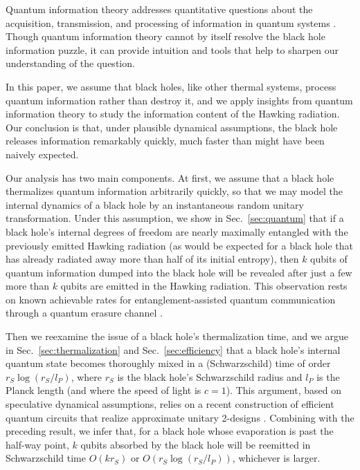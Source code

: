 \documentclass[11pt]{article}
\begin{document}
Quantum information theory addresses quantitative questions about the acquisition, transmission, and processing of information in quantum systems \cite{bennett-shor}. Though quantum information theory cannot by itself resolve the black hole information puzzle, it can provide intuition and tools that help to sharpen our understanding of the question. 

In this paper, we assume that black holes, like other thermal systems, process quantum information rather than destroy it, and we apply insights from quantum information theory to study the information content of the Hawking radiation. Our conclusion is that, under plausible dynamical assumptions, the black hole releases information remarkably quickly, much faster than might have been naively expected.

Our analysis has two main components. At first, we assume that a black hole thermalizes quantum information arbitrarily quickly, so that we may model the internal dynamics of a black hole by an instantaneous random unitary transformation.  Under this assumption, we show in Sec.~\ref{sec:quantum} that if a black hole's internal degrees of freedom are nearly maximally entangled with the previously emitted Hawking radiation (as would be expected for a black hole that has already radiated away more than half of its initial entropy), then $k$ qubits of quantum information dumped into the black hole will be revealed after just a few more than $k$ qubits are emitted in the Hawking radiation. This observation rests on known achievable rates for entanglement-assisted quantum communication through a quantum erasure channel \cite{thapliyal}. 

Then we reexamine the issue of a black hole's thermalization time, and we argue in Sec.~\ref{sec:thermalization} and Sec.~\ref{sec:efficiency} that a black hole's internal quantum state becomes thoroughly mixed in a (Schwarzschild) time of order $r_S\log(r_S/l_{P})$, where $r_S$ is the black hole's Schwarzschild radius and $l_{P}$ is the Planck length (and where the speed of light is $c=1$). This argument, based on speculative dynamical assumptions, relies on a recent construction of efficient quantum circuits that realize approximate unitary 2-designs \cite{cleve,dankert}. Combining with the preceding result, we infer that, for a black hole whose evaporation is past the half-way point, $k$ qubits absorbed by the black hole will be reemitted in Schwarzschild time $O(kr_S)$ or $O(r_S\log(r_S/l_P))$, whichever is larger.
\end{document}
